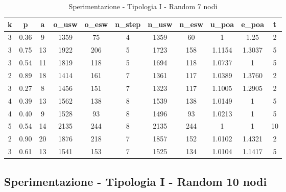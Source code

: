 \begin{table}[H]
\centering
\scalebox{0.9} {
\begin{tabular}{|c|c|c|c|c|c|c|c|c|c|c|}
\hline
\textbf{k} & \textbf{p} & \textbf{a} & \textbf{o\_usw} & \textbf{o\_esw} & \textbf{n\_step} & \textbf{n\_usw} & \textbf{n\_esw} & \textbf{u\_poa} & \textbf{e\_poa} & \textbf{t} \\ \hline
3 & 0.36 & 9 & 1359 & 75 & 4 & 1359 & 60 & 1 & 1.25 & 2 \\ \hline
3 & 0.75 & 13 & 1922 & 206 & 5 & 1723 & 158 & 1.1154 & 1.3037 & 5 \\ \hline
3 & 0.54 & 11 & 1819 & 118 & 5 & 1694 & 118 & 1.0737 & 1 & 5 \\ \hline
2 & 0.89 & 18 & 1414 & 161 & 7 & 1361 & 117 & 1.0389 & 1.3760 & 2 \\ \hline
3 & 0.27 & 8 & 1456 & 151 & 7 & 1323 & 117 & 1.1005 & 1.2905 & 2 \\ \hline
4 & 0.39 & 13 & 1562 & 138 & 8 & 1539 & 138 & 1.0149 & 1 & 5 \\ \hline
4 & 0.40 & 9 & 1528 & 93 & 8 & 1496 & 93 & 1.0213 & 1 & 5 \\ \hline
5 & 0.54 & 14 & 2135 & 244 & 8 & 2135 & 244 & 1 & 1 & 10 \\ \hline
2 & 0.90 & 20 & 1876 & 218 & 7 & 1857 & 152 & 1.0102 & 1.4321 & 2 \\ \hline
3 & 0.61 & 13 & 1541 & 153 & 7 & 1525 & 134 & 1.0104 & 1.1417 & 5 \\ \hline
\end{tabular}
}
\caption{Sperimentazione - Tipologia I - Random 7 nodi}
\label{tab:sperimentazione-tipo1-7nodi}
\end{table}


\subsection{Sperimentazione - Tipologia I - Random 10 nodi}

